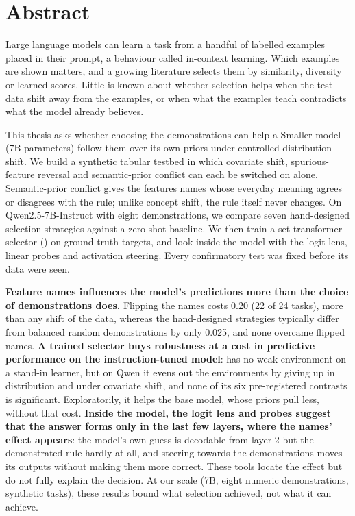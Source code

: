 \chapter*{Abstract}

Large language models can learn a task from a handful of labelled examples placed in their prompt, a behaviour called in-context learning.
Which examples are shown matters, and a growing literature selects them by similarity, diversity or learned scores.
Little is known about whether selection helps when the test data shift away from the examples, or when what the examples teach contradicts what the model already believes.

This thesis asks whether choosing the demonstrations can help a Smaller model (7B parameters) follow them over its own priors under controlled distribution shift.
We build a synthetic tabular testbed in which covariate shift, spurious-feature reversal and semantic-prior conflict can each be switched on alone.
Semantic-prior conflict gives the features names whose everyday meaning agrees or disagrees with the rule; unlike concept shift, the rule itself never changes.
On Qwen2.5-7B-Instruct with eight demonstrations, we compare seven hand-designed selection strategies against a zero-shot baseline.
We then train a set-transformer selector (\sata) on ground-truth targets, and look inside the model with the logit lens, linear probes and activation steering.
Every confirmatory test was fixed before its data were seen.

\textbf{Feature names influences the model's predictions more than the choice of demonstrations does.}
Flipping the names costs 0.20 \AUROC (22 of 24 tasks), more than any shift of the data, whereas the hand-designed strategies typically differ from balanced random demonstrations by only 0.025, and none overcame flipped names.
\textbf{A trained selector buys robustness at a cost in predictive performance on the instruction-tuned model}: \sata has no weak environment on a stand-in learner, but on Qwen it evens out the environments by giving up \AUROC in distribution and under covariate shift, and none of its six pre-registered contrasts is significant.
Exploratorily, it helps the base model, whose priors pull less, without that cost.
\textbf{Inside the model, the logit lens and probes suggest that the answer forms only in the last few layers, where the names' effect appears}: the model's own guess is decodable from layer 2 but the demonstrated rule hardly at all, and steering towards the demonstrations moves its outputs without making them more correct.
These tools locate the effect but do not fully explain the decision.
At our scale (7B, eight numeric demonstrations, synthetic tasks), these results bound what selection achieved, not what it can achieve.

